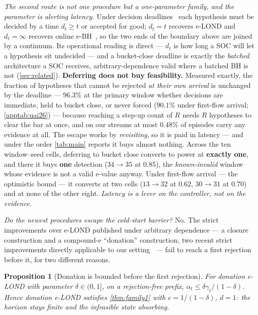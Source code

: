 \documentclass[conference]{IEEEtran}
\newtheorem{proposition}[theorem]{Proposition}
\newcommand{\alphat}{\alpha_t}
\begin{document}
\emph{The second route is not one procedure but a one-parameter family, and the parameter is
alerting latency.} Under decision deadlines~\cite{fisher2022deadlines} each hypothesis must be
decided by a time $d_t \ge t$ or accepted for good; $d_t = t$ recovers e-LOND and
$d_t = \infty$ recovers online e-BH~\cite{xu2026eclosure}, so the two ends of the boundary above are
joined by a continuum. Its operational reading is direct --- $d_t$ is how long a SOC will let a
hypothesis sit undecided --- and a bucket-close deadline is exactly the \emph{batched} architecture a
SOC receives, arbitrary-dependence valid where a batched BH is not (\cref{sec:related}).
\textbf{Deferring does not buy feasibility.} Measured exactly, the fraction of hypotheses that cannot
be rejected \emph{at their own arrival} is unchanged by the deadline --- $96.3\%$ at the primary
window whether decisions are immediate, held to bucket close, or never forced ($90.1\%$ under
first-flow arrival; \cref{apptab:uai26}) --- because reaching a step-up count of $R$ needs $R$
hypotheses to clear the bar at once, and on our streams at most $0.48\%$ of episodes carry
any evidence at all. The
escape works by \emph{revisiting}, so it is paid in latency --- and under the order \cref{tab:main}
reports it buys almost nothing. Across the ten window--seed cells, deferring to bucket close converts
to power at \textbf{exactly one}, and there it buys \textbf{one} detection ($34\to35$ at $0.85$), the
\emph{known-invalid} window whose evidence is not a valid e-value anyway. Under first-flow arrival ---
the optimistic bound --- it converts at two cells ($13\to32$ at $0.62$, $30\to31$ at $0.70$) and at
none of the other eight. \emph{Latency is a lever on the controller, not on the evidence.}

\emph{Do the newest procedures escape the cold-start barrier?} No. The strict improvements over
e-LOND published under arbitrary dependence --- a closure construction and a compound-e ``donation''
construction, two recent strict improvements directly applicable to our
setting~\cite{xu2026eclosure,xu2025closure} ---
fail to reach a first rejection before it, for two different reasons.

\begin{proposition}[Donation is bounded before the first rejection]\label{prop:donation}
For donation e-LOND with parameter $\delta\in(0,1]$, on a rejection-free prefix,
$\alphat \le \delta\gamma_t/(1-\delta)$. Hence donation e-LOND satisfies \cref{thm:family1} with
$c = 1/(1-\delta)$, $d = 1$: the horizon stays finite and the infeasible state absorbing.
\end{proposition}
\end{document}
